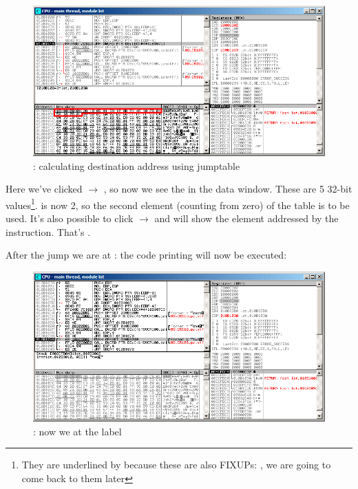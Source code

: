 \begin{figure}[H]
\centering
\includegraphics[scale=\FigScale]{patterns/08_switch/2_lot/olly3.png}
\caption{\olly: calculating destination address using jumptable}
\label{fig:switch_lot_olly3}
\end{figure}

Here we've clicked  $\rightarrow$ , so now we see the  in the data window.
These are 5 32-bit values\footnote{They are underlined by \olly because
these are also FIXUPs: , we are going to come back to them later}.
\ECX is now 2, so the second element (counting from zero) of the table is to be used.
It's also possible to click  $\rightarrow$ 
 and \olly will show the element addressed by the \JMP instruction. 
That's .

\clearpage
After the jump we are at : the code printing  will now be executed:

\begin{figure}[H]
\centering
\includegraphics[scale=\FigScale]{patterns/08_switch/2_lot/olly4.png}
\caption{\olly: now we at the  label}
\label{fig:switch_lot_olly4}
\end{figure}
